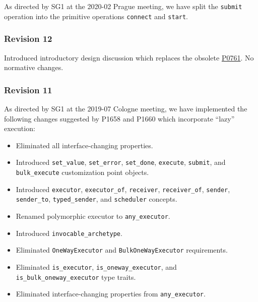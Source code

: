 \documentclass[a4paper,12pt,notitlepage,twoside,openright]{article}
\begin{document}
As directed by SG1 at the 2020-02 Prague meeting, we have split the
\texttt{submit} operation into the primitive operations
\texttt{connect} and \texttt{start}.

\hypertarget{revision-12}{%
\subsubsection{Revision 12}\label{revision-12}}

Introduced introductory design discussion which replaces the obsolete
\href{https://wg21.link/P0761}{P0761}. No normative changes.

\hypertarget{revision-11}{%
\subsubsection{Revision 11}\label{revision-11}}

As directed by SG1 at the 2019-07 Cologne meeting, we have implemented
the following changes suggested by P1658 and P1660 which incorporate
``lazy'' execution:

\begin{itemize}

\item
  Eliminated all interface-changing properties.
\item
  Introduced \texttt{set_value},
  \texttt{set_error}, \texttt{set_done},
  \texttt{execute}, \texttt{submit}, and
  \texttt{bulk_execute} customization point objects.
\item
  Introduced \texttt{executor},
  \texttt{executor_of}, \texttt{receiver},
  \texttt{receiver_of}, \texttt{sender},
  \texttt{sender_to}, \texttt{typed_sender}, and
  \texttt{scheduler} concepts.
\item
  Renamed polymorphic executor to \texttt{any_executor}.
\item
  Introduced \texttt{invocable_archetype}.
\item
  Eliminated \texttt{OneWayExecutor} and
  \texttt{BulkOneWayExecutor} requirements.
\item
  Eliminated \texttt{is_executor},
  \texttt{is_oneway_executor}, and
  \texttt{is_bulk_oneway_executor} type traits.
\item
  Eliminated interface-changing properties from
  \texttt{any_executor}.
\end{itemize}
\end{document}
